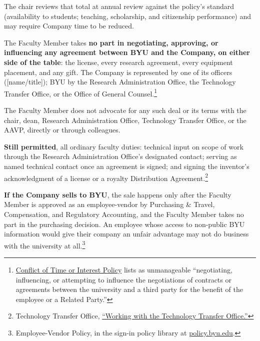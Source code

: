 \documentclass[11pt]{article}
\begin{document}
 The chair reviews that total at annual review against the policy's
standard (availability to students; teaching, scholarship, and citizenship
performance) and may require Company time to be reduced.


 The Faculty Member takes \textbf{no part in negotiating,
approving, or influencing any agreement between BYU and the Company, on either
side of the table}: the license, every research agreement, every equipment
placement, and any gift. The Company is represented by one of its officers
([name/title]); BYU by the Research Administration Office, the Technology
Transfer Office, or the Office of General
Counsel.\footnote{\href{https://policy.byu.edu/view/conflict-of-time-or-interest-policy}{Conflict
of Time or Interest Policy} lists as unmanageable ``negotiating, influencing,
or attempting to influence the negotiations of contracts or agreements between
the university and a third party for the benefit of the employee or a Related
Party.''}

 The Faculty Member does not advocate for any such deal or its
terms with the chair, dean, Research Administration Office, Technology
Transfer Office, or the AAVP, directly or through colleagues.

 \textbf{Still permitted}, all ordinary faculty duties: technical
input on scope of work through the Research Administration Office's designated
contact; serving as named technical contact once an agreement is signed; and
signing the inventor's acknowledgment of a license or a royalty Distribution
Agreement.\footnote{Technology Transfer Office,
\href{https://techtransfer.byu.edu/resources}{``Working with the Technology
Transfer Office.''}}

 \textbf{If the Company sells to BYU}, the sale happens only after
the Faculty Member is approved as an employee-vendor by Purchasing \& Travel,
Compensation, and Regulatory Accounting, and the Faculty Member takes no part
in the purchasing decision. An employee whose access to non-public BYU
information would give their company an unfair advantage may not do business
with the university at all.\footnote{Employee-Vendor Policy, in the sign-in
policy library at \href{https://policy.byu.edu}{policy.byu.edu}.}

\end{document}
